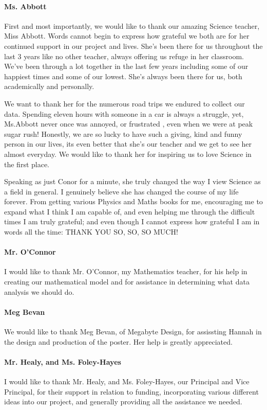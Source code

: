 \paragraph{Ms. Abbott}
First and most importantly, we would like to thank our amazing Science teacher, Miss Abbott. Words cannot begin to express how grateful we both are for her continued support in our project and lives. She’s been there for us throughout the last 3 years like no other teacher, always offering us refuge in her classroom. We’ve been through a lot together in the last few years including some of our happiest times and some of our lowest. She’s always been there for us, both academically and personally. 

We want to thank her for the numerous road trips we endured to collect our data. Spending eleven hours with someone in a car is always a struggle, yet, Ms.Abbott never once was annoyed, or frustrated , even when we were at peak sugar rush! Honestly, we are so lucky to have such a giving, kind and funny person in our lives, its even better that she’s our teacher and we get to see her almost everyday. We would like to thank her for inspiring us to love Science in the first place. 

Speaking as just Conor for a minute, she truly changed the way I view Science as a field in general. I genuinely believe she has changed the course of my life forever. From getting various Physics and Maths books for me, encouraging me to expand what I think I am capable of, and even helping me through the difficult times I am truly grateful; and even though I cannot express how grateful I am in words all the time: THANK YOU SO, SO, SO MUCH! 
\paragraph{Mr. O'Connor}
I would like to thank Mr. O’Connor, my Mathematics teacher, for his help in creating our mathematical model and for assistance in determining what data analysis we should do.
\paragraph{Meg Bevan}
We would like to thank Meg Bevan, of Megabyte Design, for assissting Hannah in the design and production of the poster. Her help is greatly appreciated.
\paragraph{Mr. Healy, and Ms. Foley-Hayes}
I would like to thank Mr. Healy, and Ms. Foley-Hayes, our Principal and Vice Principal, for their support in relation to funding, incorporating various different ideas into our project, and generally providing all the assistance we needed.
